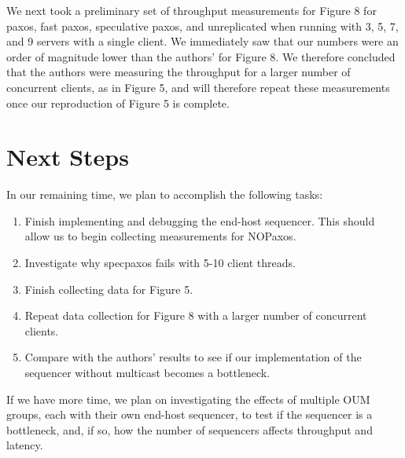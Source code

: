 We next took a preliminary set of throughput measurements for Figure 8 for paxos, fast paxos, speculative paxos, and unreplicated when running with 3, 5, 7, and 9 servers with a single client. We immediately saw that our numbers were an order of magnitude lower than the authors’ for Figure 8. We therefore concluded that the authors were measuring the throughput for a larger number of concurrent clients, as in Figure 5, and will therefore repeat these measurements once our reproduction of Figure 5 is complete. 

\section{Next Steps}
In our remaining time, we plan to accomplish the following tasks:

\begin{enumerate}
  \item Finish implementing and debugging the end-host sequencer. This should allow us to begin collecting measurements for NOPaxos.
  \item Investigate why specpaxos fails with 5-10 client threads.
  \item Finish collecting data for Figure 5.
  \item Repeat data collection for Figure 8 with a larger number of concurrent clients.
  \item Compare with the authors' results to see if our implementation of the sequencer without multicast becomes a bottleneck.
\end{enumerate}

If we have more time, we plan on investigating the effects of multiple OUM groups, each with their own end-host sequencer, to test if the sequencer is a bottleneck, and, if so, how the number of sequencers affects throughput and latency.


